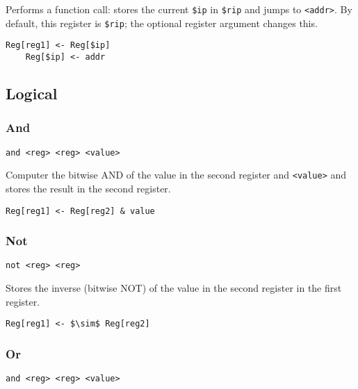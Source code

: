 Performs a function call: stores the current \texttt{\$ip} in \texttt{\$rip} and jumps to \texttt{<addr>}.
By default, this register is \texttt{\$rip}; the optional register argument changes this.

\begin{lstlisting}[style=rtn]
    Reg[reg1] <- Reg[$ip]
    Reg[$ip] <- addr
\end{lstlisting}

\subsection{Logical}

\subsubsection{And}

\begin{lstlisting}[style=assembly]
    and <reg> <reg> <value>
\end{lstlisting}

Computer the bitwise AND of the value in the second register and \texttt{<value>} and stores the result in the second register.

\begin{lstlisting}[style=rtn,mathescape]
    Reg[reg1] <- Reg[reg2] & value
\end{lstlisting}

\subsubsection{Not}

\begin{lstlisting}[style=assembly]
    not <reg> <reg>
\end{lstlisting}

Stores the inverse (bitwise NOT) of the value in the second register in the first register.

\begin{lstlisting}[style=rtn,mathescape]
    Reg[reg1] <- $\sim$ Reg[reg2]
\end{lstlisting}

\subsubsection{Or}

\begin{lstlisting}[style=assembly]
    and <reg> <reg> <value>
\end{lstlisting}

